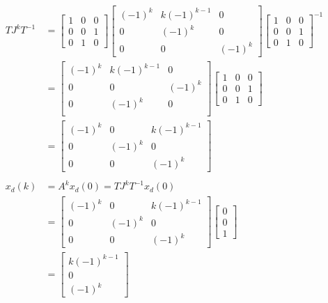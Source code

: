 \documentclass[12pt,a4paper]{article}
\begin{document}
\begin{align*}
	TJ^kT^{-1} &= \begin{bmatrix}
		1 & 0 & 0 \\
		0 & 0 & 1 \\
		0 & 1 & 0
	\end{bmatrix}\begin{bmatrix}
		(-1)^k & k(-1)^{k - 1} & 0 \\
	0 & (-1)^k & 0 \\
	0 & 0 & (-1)^k
	\end{bmatrix}\begin{bmatrix}
	1 & 0 & 0 \\
	0 & 0 & 1 \\
	0 & 1 & 0
	\end{bmatrix}^{-1} \\
	&= \begin{bmatrix}
		(-1)^k & k(-1)^{k - 1} & 0 \\
		0 & 0 & (-1)^k \\
		0 & (-1)^k & 0 \\
	\end{bmatrix}\begin{bmatrix}
	1 & 0 & 0 \\
	0 & 0 & 1 \\
	0 & 1 & 0
	\end{bmatrix} \\
	&=  \begin{bmatrix}
		(-1)^k & 0 & k(-1)^{k - 1} \\
		0 & (-1)^k & 0 \\
		0 & 0 & (-1)^k
	\end{bmatrix}
\\ \\
	x_d(k) &= A^k x_d(0) = TJ^kT^{-1} x_d(0) \\
	&=\begin{bmatrix}
		(-1)^k & 0 & k(-1)^{k - 1} \\
		0 & (-1)^k & 0 \\
		0 & 0 & (-1)^k
	\end{bmatrix} \begin{bmatrix}
	0 \\ 0 \\ 1
	\end{bmatrix} \\
	&= \begin{bmatrix}
		k(-1)^{k - 1} \\ 0 \\ (-1)^k
	\end{bmatrix}
\end{align*}
\end{document}
